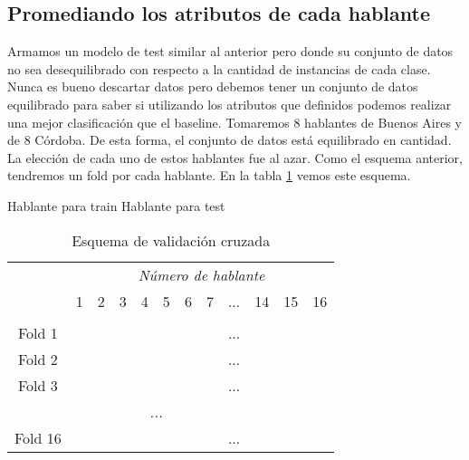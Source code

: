 \subsection{Promediando los atributos de cada hablante}
\label{prom_los_atributos_de_cada_hablante}

Armamos un modelo de test similar al anterior pero donde su conjunto de datos no sea desequilibrado con respecto a la cantidad de instancias de cada clase. Nunca es bueno descartar datos pero debemos tener un conjunto de datos equilibrado para saber si utilizando los atributos que definidos podemos realizar una mejor clasificación que el baseline. Tomaremos 8 hablantes de Buenos Aires y de 8 Córdoba. De esta forma, el conjunto de datos está equilibrado en cantidad. La elección de cada uno de estos hablantes fue al azar. Como el esquema anterior, tendremos un fold por cada hablante. En la tabla \ref{PAH_esq_cv} vemos este esquema.

\begin{center}
	\mycirc[blue] Hablante para train \mycirc[red] Hablante para test
\end{center}

\begin{table}[H]
	\centering
	\begin{tabular}{cccccccccccc}
		& \multicolumn{11}{c}{\textit{Número de hablante}} \\
		& 1 & 2 & 3 & 4 & 5 & 6 & 7 & ... & 14 & 15 & 16 \\
		\hline \\
		Fold 1 &\mycirc[red] & \mycirc[blue] & \mycirc[blue]  & \mycirc[blue]  & \mycirc[blue]  & \mycirc[blue]  & \mycirc[blue] & ... & \mycirc[blue] & \mycirc[blue] & \mycirc[blue]  \\
		
		Fold 2 &\mycirc[blue] & \mycirc[red] & \mycirc[blue]  & \mycirc[blue]  & \mycirc[blue]  & \mycirc[blue]  & \mycirc[blue] & ... & \mycirc[blue] & \mycirc[blue] & \mycirc[blue]  \\
		
		Fold 3 &\mycirc[blue] & \mycirc[blue] & \mycirc[red]  & \mycirc[blue]  & \mycirc[blue]  & \mycirc[blue]  & \mycirc[blue] & ... & \mycirc[blue] & \mycirc[blue] & \mycirc[blue]  \\
		
		\multicolumn{11}{c}{\textit{...}}	\\
		
		Fold 16 &\mycirc[blue] & \mycirc[blue] & \mycirc[blue]  & \mycirc[blue]  & \mycirc[blue]  & \mycirc[blue]  & \mycirc[blue] & ... & \mycirc[blue] & \mycirc[blue] & \mycirc[red]   \\
		
	\end{tabular}
	\caption{Esquema de validación cruzada}
	\label{PAH_esq_cv}
\end{table}

